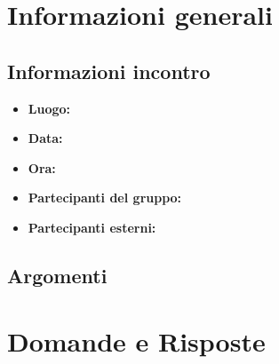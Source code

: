 \documentclass[a4paper, oneside, openany,12pt]{article}
\begin{document}
	\restoregeometry
	
	\section{Informazioni generali}
	\subsection{Informazioni incontro}
	\begin{itemize}
		\item { \textbf{Luogo:}  }
		\item { \textbf{Data:} }
		\item { \textbf{Ora:} }
		\item { \textbf{Partecipanti del gruppo:} }
		\item { \textbf{Partecipanti esterni:} }
	\end{itemize}
	
	\subsection{Argomenti}
	
	\section{Domande e Risposte}
	
	
	
\end{document}
